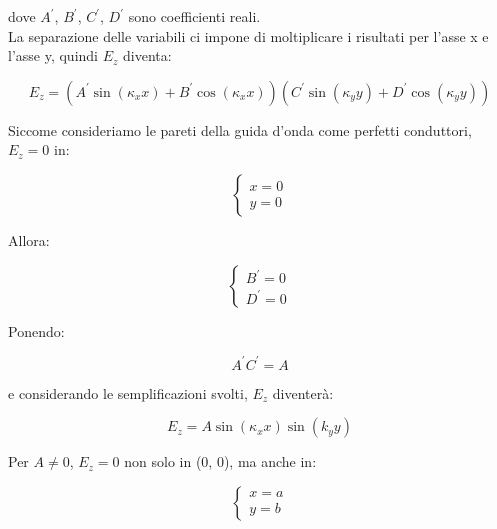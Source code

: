dove $A^{'}$, $B^{'}$, $C^{'}$, $D^{'}$ sono coefficienti reali. \\ 

La separazione delle variabili ci impone di moltiplicare i risultati 
per l'asse x e l'asse y, quindi $E_z$ diventa: 

{
    \Large 
    \begin{equation}
        E_z 
        = 
        (A^{'} \sin(\kappa_x x) + B^{'} \cos(\kappa_x x))  (C^{'} \sin(\kappa_y y) + D^{'} \cos(\kappa_y y))
    \end{equation}
}

Siccome consideriamo le pareti della guida d'onda come perfetti conduttori, 
$E_z = 0$ in: 

{
    \Large 
    \begin{equation}
        \begin{cases}
            x = 0 \\ 
            y= 0
        \end{cases}
    \end{equation}
} 

Allora: 

{
    \Large 
    \begin{equation}
        \begin{cases}
            B^{'}= 0 \\ 
            D^{'}= 0
        \end{cases}
    \end{equation}
} 

Ponendo: 

{
    \Large 
    \begin{equation}
            A^{'}C^{'} = A 
    \end{equation}
} 

e considerando le semplificazioni svolti, $E_z$ diventerà: 

{
    \Large 
    \begin{equation}
        E_z = A \sin(\kappa_x x) \sin(k_y y)
    \end{equation}
}

Per $A \neq 0$, $E_z = 0$ non solo in (0, 0), ma anche in: 

{
    \Large 
    \begin{equation}
        \begin{cases}
            x = a \\ 
            y= b
        \end{cases}
    \end{equation}
}


